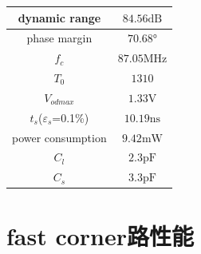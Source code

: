 \documentclass[a4paper]{article}
\newcommand{\uV}{\si{\volt}}
\newcommand{\upF}{\si{\pico\farad}}
\newcommand{\uns}{\si{\nano\second}}
\newcommand{\umW}{\si{\milli\watt}}
\newcommand{\uMHz}{\si{\mega\hertz}}
\newcommand{\udB}{\si{\deci\bel}}
\newcommand{\udeg}{\si{\degree}}
\begin{document}
\begin{table}[htbp]
    \begin{tabular}{|c|c|}
        \hline
        dynamic range&$84.56\udB$
        \\\hline
        phase margin&$70.68\udeg$
        \\\hline
        $f_c$ &$87.05\uMHz$
        \\\hline 
        $T_0$&$1310$
        \\\hline
        $V_{odmax}$&$1.33\uV$
        \\\hline
        $t_s$($\varepsilon_s$=0.1\%)&$10.19\uns$
        \\\hline
        power consumption&$9.42\umW$
        \\\hline
        $C_l$&$2.3\upF$
        \\\hline
        $C_s$&$3.3\upF$
        \\\hline
    \end{tabular}
\end{table}
\newpage
\clearpage

\section{fast corner路性能}
\end{document}
